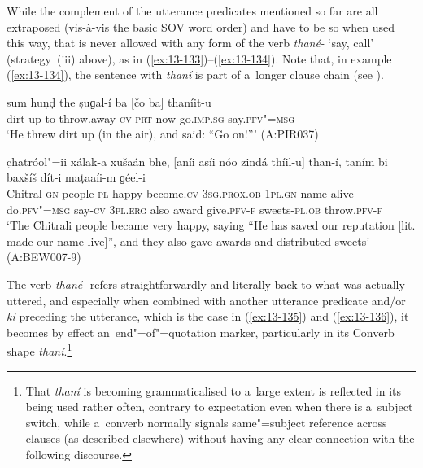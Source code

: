 While the complement of the utterance predicates mentioned so far are all extraposed (vis-à-vis the basic SOV word order) and have to be so when used this way, that is never allowed with any form of the verb \textit{thané-} `say, call' (strategy~(iii) above), as in (\ref{ex:13-133})--(\ref{ex:13-134}). Note that, in example (\ref{ex:13-134}), the sentence with \textit{thaní} is part of a~longer clause chain (see ).

\begin{exe}
\ex
\label{ex:13-133}
\gll sum huṇḍ the ṣuɡal-í ba [čo ba]  thaníit-u \\
dirt up to throw.away-\textsc{cv} \textsc{prt} now go.\textsc{imp.sg} say.\textsc{pfv"=msg} \\
\glt `He threw dirt up (in the air), and said: ``Go on!''' (A:PIR037)

\ex
\label{ex:13-134}
\gll c̣hatróol"=ii xálak-a xušaán bhe,  [aníi asíi nóo zindá thíil-u]
than-í,  taním bi baxšíš dít-i maṭaaíi-m   ɡéel-i \\
Chitral-\textsc{gn} people-\textsc{pl} happy become.\textsc{cv}  \textsc{3sg.prox.ob } \textsc{1pl.gn} name alive do.\textsc{pfv"=msg} say-\textsc{cv}  \textsc{3pl.erg} also award give.\textsc{pfv-f} sweets-\textsc{pl.ob} throw.\textsc{pfv-f}  \\
\glt `The Chitrali people became very happy, saying ``He has saved our reputation [lit. made our name live]'', and they also gave awards and distributed sweets' (A:BEW007-9) 
\end{exe}

The verb \textit{thané-} refers straightforwardly and literally back to what was actually uttered,
and especially when combined with another utterance predicate and/or \textit{ki} preceding the
utterance, which is the case in (\ref{ex:13-135}) and (\ref{ex:13-136}), it becomes by effect
an~end"=of"=quotation marker, particularly in its Converb shape \textit{thaní}.\footnote{That
  \textit{thaní} is becoming grammaticalised to a~large extent is reflected in its being used rather
  often, contrary to expectation even when there is a~subject switch, while a~converb normally
  signals same"=subject reference across clauses (as described elsewhere) without having any clear
  connection with the following discourse.}

